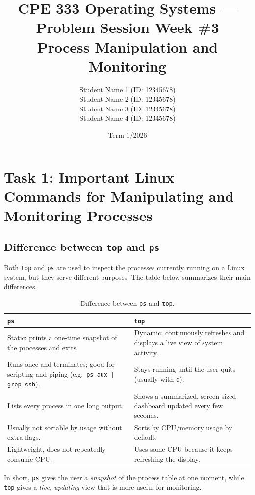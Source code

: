 \documentclass[11pt,a4paper]{article}
\title{\textbf{CPE 333 Operating Systems --- Problem Session Week \#3}\\Process Manipulation and Monitoring}
\author{
  \begin{tabular}{c}
    Student Name 1 \quad (ID: 12345678) \\
    Student Name 2 \quad (ID: 12345678) \\
    Student Name 3 \quad (ID: 12345678) \\
    Student Name 4 \quad (ID: 12345678) \\
  \end{tabular}
}
\date{Term 1/2026}
\begin{document}
\maketitle
\thispagestyle{empty}

\newpage
\tableofcontents
\newpage

\section{Task 1: Important Linux Commands for Manipulating and Monitoring Processes}

\subsection{Difference between \texttt{top} and \texttt{ps}}

Both \texttt{top} and \texttt{ps} are used to inspect the processes currently running on a
Linux system, but they serve different purposes. The table below summarizes their main
differences.

\begin{table}[h!]
\centering
\begin{tabular}{@{}p{}p{}@{}}
\toprule
\textbf{\texttt{ps}} & \textbf{\texttt{top}} \\
\midrule
Static: prints a one-time snapshot of the processes and exits. &
Dynamic: continuously refreshes and displays a live view of system activity. \\
Runs once and terminates; good for scripting and piping (e.g.\ \texttt{ps aux | grep ssh}). &
Stays running until the user quits (usually with \texttt{q}). \\
Lists every process in one long output. &
Shows a summarized, screen-sized dashboard updated every few seconds. \\
Usually not sortable by usage without extra flags. &
Sorts by CPU/memory usage by default. \\
Lightweight, does not repeatedly consume CPU. &
Uses some CPU because it keeps refreshing the display. \\
\bottomrule
\end{tabular}
\caption{Difference between \texttt{ps} and \texttt{top}.}
\end{table}

In short, \texttt{ps} gives the user a \emph{snapshot} of the process table at one moment,
while \texttt{top} gives a \emph{live, updating} view that is more useful for monitoring.
\end{document}
